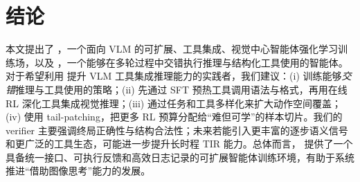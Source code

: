 \section{结论}
\label{sec:conclusion}
本文提出了 \env{}，一个面向 VLM 的可扩展、工具集成、视觉中心智能体强化学习训练场，以及 \ours{}，一个能够在多轮过程中交错执行推理与结构化工具使用的智能体。对于希望利用 \env{} 提升 VLM 工具集成推理能力的实践者，我们建议：(i) 训练能够\emph{交错}推理与工具使用的策略；(ii) 先通过 SFT 预热工具调用语法与格式，再用在线 RL 深化工具集成视觉推理；(iii) 通过任务和工具多样化来扩大动作空间覆盖；(iv) 使用 tail-patching，把更多 RL 预算分配给“难但可学”的样本切片。我们的 verifier 主要强调终局正确性与结构合法性；未来若能引入更丰富的逐步语义信号和更广泛的工具生态，可能进一步提升长时程 TIR 能力。总体而言，\env{} 提供了一个具备统一接口、可执行反馈和高效日志记录的可扩展智能体训练环境，有助于系统推进“借助图像思考”能力的发展。
